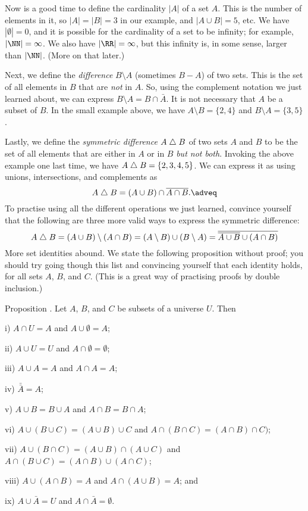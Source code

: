 Now is a good time to define the cardinality $|A|$ of a set $A$.
This is the number of elements in it, so $|A| = |B| = 3$
in our example, and $|A\cup B| = 5$, etc. We have $|\emptyset| = 0$, and it is possible for the cardinality of
a set to be infinity; for example, $|\NN| = \infty$. We also have $|\RR| = \infty$, but this infinity
is, in some sense, larger than $|\NN|$. (More on that later.)

Next, we define the {\it difference} $B\setminus A$ (sometimes $B-A$) of two sets.
This is the set of all elements
in $B$ that are {\it not} in $A$. So, using the complement notation we just learned about,
we can express $B\setminus A = B \cap \bar A$. It is not necessary that $A$ be a subset of $B$. In
the small example above, we have $A\setminus B = \{2,4\}$ and $B\setminus A = \{3,5\}$.

Lastly, we define the {\it symmetric difference} $A \mathrel{\triangle} B$ of two sets $A$ and $B$ to be the set of all
elements that are either in $A$ or in $B$ {\it but not both}.
Invoking the above example one last time, we
have $A\mathrel{\triangle} B = \{2,3,4,5\}$.
We can express it as using unions, intersections,
and complements as
\edef\eqsymdiffdef{\the\eqcount}
$$A \symdiff B = (A\cup B) \cap \bar{A \cap B}.\adveq$$
To practise using all the different operations we just learned,
convince yourself that the following are three more valid ways to express the symmetric difference:
$$A\mathrel{\triangle} B = (A\cup B)\setminus (A\cap B) = (A\setminus B) \cup (B\setminus A) =
\overline{\overline{A\cup B} \cup (A\cap B)}$$
More set identities abound. We state the following proposition without proof; you should try going
though this list and convincing yourself that each identity holds, for all sets $A$, $B$, and $C$.
(This is a great way of practising proofs by double inclusion.)

\edef\propsetlaws{\the\thmcount}
\proclaim Proposition \advthm. Let $A$, $B$, and $C$ be subsets of a universe $U$. Then
\medskip
\item{i)} $A\cap U = A$ and $A\cup \emptyset = A$;
\smallskip
\item{ii)} $A\cup U = U$ and $A\cap \emptyset = \emptyset$;
\smallskip
\item{iii)} $A\cup A = A$ and $A\cap A = A$;
\smallskip
\item{iv)} $\bar{\bar A} = A$;
\smallskip
\item{v)} $A\cup B = B\cup A$ and $A\cap B = B\cap A$;
\smallskip
\item{vi)} $A\cup (B\cup C) = (A\cup B) \cup C$ and $A\cap (B\cap C) = (A\cap B)\cap C)$;
\smallskip
\item{vii)} $A\cup (B\cap C) = (A\cup B) \cap (A\cup C)$ and $A\cap (B\cup C) = (A\cap B)\cup (A\cap C)$;
\smallskip
\item{viii)} $A\cup (A\cap B) = A$ and $A\cap (A\cup B) = A$; and
\smallskip
\item{ix)} $A\cup \bar A = U$ and $A\cap \bar A = \emptyset$.\slug
\medskip

